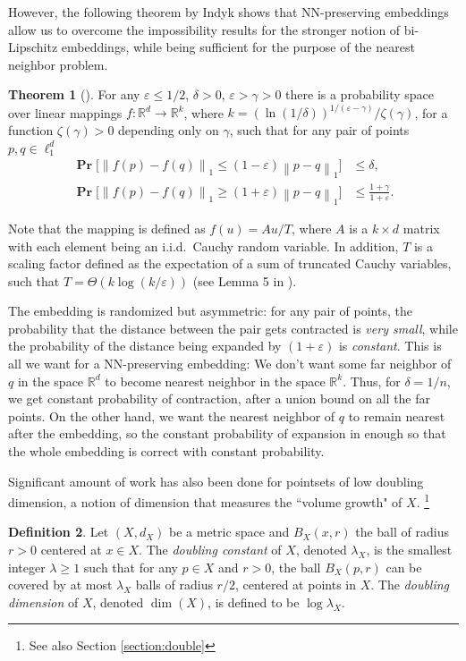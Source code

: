 \documentclass[10pt,a4paper,twoside]{book}
\newcommand{\rd}{\mathbb{R}^{d}}
\newcommand{\rk}{\mathbb{R}^{k}}
\newcommand{\eps}{\varepsilon}
\newcommand{\norm}[1]{\left \rVert {#1} \right \rVert}
\DeclareMathOperator*{\prob}{\mathbf{Pr}}
\theoremstyle{definition}
\newtheorem{definition}{Definition}[chapter]
\newtheorem{theorem}[definition]{Theorem}
\theoremstyle{remark}
\begin{document}
However, the following theorem by Indyk shows that NN-preserving embeddings allow us to overcome the impossibility results for the stronger notion of bi-Lipschitz embeddings, while being sufficient for the purpose of the nearest neighbor problem.

\begin{theorem}[\cite{Ind06}] \label{theorem:indyk}
For any $\varepsilon \leq 1/2$, $\delta > 0$, $\varepsilon > \gamma >0$ there is a probability space over linear mappings $f: \rd \rightarrow \rk$, where $k = (\ln{(1/\delta)})^{1/(\eps - \gamma)} / \zeta(\gamma)$, for a function $\zeta(\gamma)>0$ depending only on $\gamma$, such that for any pair of points $p,q \in \ell_1^d$
\begin{equation*} 
\begin{aligned} 
    \prob \Big[\norm{f(p) - f(q)}_1 \leq (1 - \eps) \norm{p-q}_1 \Big] &\leq \delta, \\
    \prob \Big[\norm{f(p) - f(q)}_1 \geq (1 + \eps) \norm{p-q}_1 \Big] &\leq \frac{1+\gamma}{1+ \eps}.
\end{aligned}
\end{equation*}
\end{theorem}
Note that the mapping is defined as $f(u) = Au/T$, where $A$ is a $k{\times}d$ matrix with each element being an i.i.d.\ Cauchy random variable. In addition, $T$ is a scaling factor defined as the expectation of a sum of truncated Cauchy variables, such that $T = \Theta(k \log{(k/ \eps)})$ (see Lemma 5 in \cite{Ind06}).

The embedding is randomized but asymmetric: for any pair of points, the probability that the distance between the pair gets contracted is \textit{very small}, while the probability of the distance being expanded by $(1+\eps)$ is \textit{constant}. This is all we want for a NN-preserving embedding: We don't want some far neighbor of $q$ in the space $\rd$ to become nearest neighbor in the space $\rk$. Thus, for $\delta=1/n$, we get constant probability of contraction, after a union bound on all the far points. On the other hand, we want the nearest neighbor of $q$ to remain nearest after the embedding, so the constant probability of expansion in enough so that the whole embedding is correct with constant probability.

Significant amount of work has also been done for pointsets of low doubling dimension, a notion of dimension that measures the ``volume growth" of $X$. \footnote{See also Section \ref{section:double}}
\begin{definition} \label{def:double}
Let $(X, d_X)$ be a metric space and $B_X(x,r)$ the ball of radius $r>0$ centered at $x \in X$. The {\em doubling constant} of $X$, denoted $\lambda_X$, is the smallest integer $\lambda \geq 1$ such that for any $p \in X$ and $r > 0$, the ball $B_X(p,r)$ can be covered by at most $\lambda_X$ balls of radius $r/2$, centered at points in $X$. The \textit{doubling dimension} of $X$, denoted $\dim(X)$, is defined to be $\log{\lambda_X}$.
\end{definition}
\end{document}
